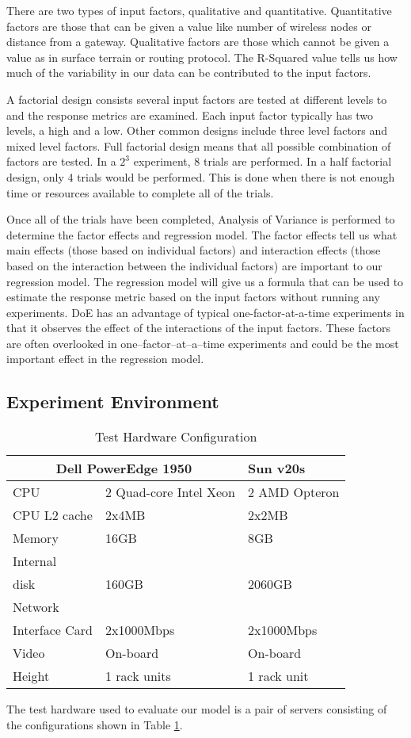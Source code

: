 \documentclass[times, 10pt,onecolumn]{article}
\begin{document}
There are two types of input factors, qualitative and quantitative.
Quantitative factors are those that can be given a value like number of
wireless nodes or distance from a gateway.  Qualitative factors are those
which cannot be given a value as in surface terrain or routing protocol.  The
R-Squared value tells us how much of the variability in our data can be
contributed to the input factors.

A factorial design consists several input factors are tested at different
levels to and the response metrics are examined.  Each input factor typically
has two levels, a high and a low.  Other common designs include three level
factors and mixed level factors.  Full factorial design means that all
possible combination of factors are tested.  In a $2^{3}$ experiment, 8 trials
are performed.  In a half factorial design, only 4 trials would be performed.
This is done when there is not enough time or resources available to complete
all of the trials.

Once all of the trials have been completed, Analysis of Variance is performed
to determine the factor effects and regression model.  The factor effects tell
us what main effects (those based on individual factors) and interaction
effects (those based on the interaction between the individual factors) are
important to our regression model.  The regression model will give us a
formula that can be used to estimate the response metric based on the input
factors without running any experiments.  DoE has an advantage of typical
one-factor-at-a-time experiments in that it observes the effect of the
interactions of the input factors.  These factors are often overlooked in
one--factor--at--a--time experiments and could be the most important effect
in the regression model.

\subsection{Experiment Environment}
\label{sec:expdesign}
\begin{table}
  \centering
  \label{tab:hardware}
  \begin{tabular}{|l|l|l|}
    \hline
    \multicolumn{2}{c}{\textbf{Dell PowerEdge 1950}}&\textbf{Sun v20s}\\  
    \hline 
    CPU&2 Quad-core Intel Xeon &2 AMD Opteron\\
    \hline 
    CPU L2 cache&2x4MB&2x2MB\\
    \hline 
    Memory&16GB&8GB\\
    \hline 
    Internal\\disk&160GB&2060GB\\
    \hline 
    Network\\ Interface Card&2x1000Mbps&2x1000Mbps\\
    \hline 
    Video&On-board&On-board \\
    \hline 
    Height&1 rack units&1 rack unit\\
    \hline
  \end{tabular}
  \caption{Test Hardware Configuration}
\end{table}
The test hardware used to evaluate our model is a pair of servers
consisting of the configurations shown in Table \ref{tab:hardware}.
\end{document}
